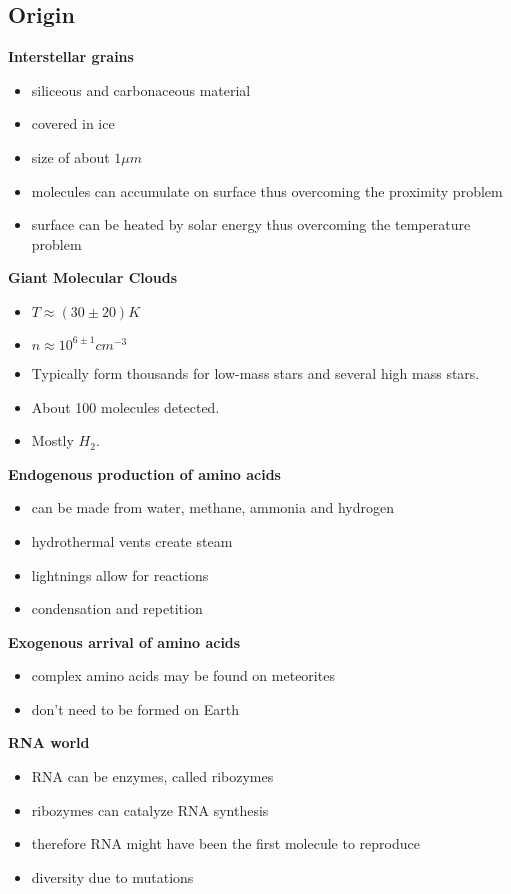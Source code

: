 \documentclass{article}
\theoremstyle{sltheorem}
\begin{document}
\subsection{Origin}
\textbf{Interstellar grains}
\begin{itemize}
    \item siliceous and carbonaceous material
    \item covered in ice
    \item size of about $1\mu m$
    \item molecules can accumulate on surface thus overcoming the proximity problem
    \item surface can be heated by solar energy thus overcoming the temperature problem
\end{itemize}
\textbf{Giant Molecular Clouds}
\begin{itemize}
    \item $T\approx (30\pm20)K$
    \item $n\approx 10^{6\pm1}cm^{-3}$
    \item Typically form thousands for low-mass stars and several high mass stars.
    \item About 100 molecules detected.
    \item Mostly $H_2$.
\end{itemize}
\textbf{Endogenous production of amino acids}
\begin{itemize}
    \item can be made from water, methane, ammonia and hydrogen
    \item hydrothermal vents create steam
    \item lightnings allow for reactions
    \item condensation and repetition
\end{itemize}
\textbf{Exogenous arrival of amino acids}
\begin{itemize}
    \item complex amino acids may be found on meteorites
    \item don't need to be formed on Earth
\end{itemize}
\textbf{RNA world}
\begin{itemize}
    \item RNA can be enzymes, called ribozymes
    \item ribozymes can catalyze RNA synthesis
    \item therefore RNA might have been the first molecule to reproduce
    \item diversity due to mutations
\end{itemize}
\end{document}
